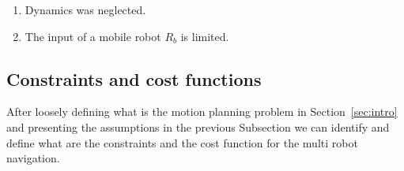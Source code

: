 \documentclass[eprint]{actapoly}
\begin{document}
\begin{enumerate}
    \item Dynamics was neglected.
    
    \item The input of a mobile robot $R_b$ is limited.
    

%    

\end{enumerate}

\subsection{Constraints and cost functions}

After loosely defining what is the motion planning problem in
Section~\ref{sec:intro} and presenting the assumptions in the previous Subsection
we can identify and define what are the constraints and the cost function for the
multi robot navigation.
\end{document}
